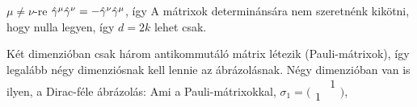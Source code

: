     $\mu\ne\nu$-re $\hat{\gamma}^\mu\hat{\gamma}^\nu=-\hat{\gamma}^\nu\hat{\gamma}^\mu$, így
    A mátrixok determinánsára nem szeretnénk kikötni, hogy nulla legyen, így $d=2k$ lehet csak. 
    
    Két dimenzióban csak három antikommutáló mátrix létezik (Pauli-mátrixok), így legalább négy dimenziósnak kell lennie az ábrázolásnak. Négy dimenzióban van is ilyen, a Dirac-féle ábrázolás:
   Ami a Pauli-mátrixokkal, $\sigma_1=\bigl(\begin{smallmatrix}
                                        & 1 \\
                                       1&  \\
                                      \end{smallmatrix}\bigr)$,
